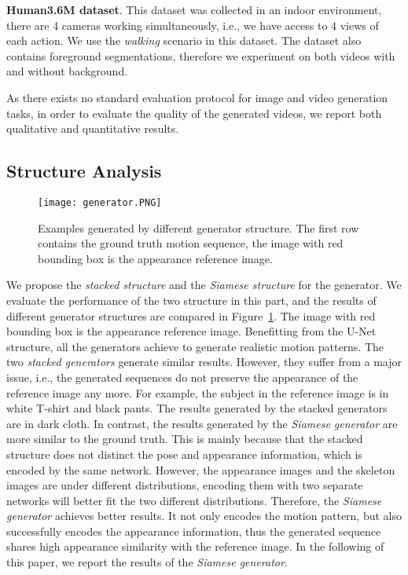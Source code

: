 \documentclass[journal]{IEEEtran}
\begin{document}
\textbf{Human3.6M dataset}. This dataset was collected in an indoor environment, there are 4 cameras working simultaneously, i.e., we have access to 4 views of each action. We use the \textit{walking} scenario in this dataset. The dataset also contains foreground segmentations, therefore we experiment on both videos with and without background.

As there exists no standard evaluation protocol for image and video generation tasks, in order to evaluate the quality of the generated videos, we report both qualitative and quantitative results.

\subsection{Structure Analysis}
\begin{figure}
\texttt{[image: generator.PNG]}
\caption{Examples generated by different generator structure. The first row contains the ground truth motion sequence, the image with red bounding box is the appearance reference image.}
\label{fig:generator}
\end{figure}
We propose the \textit{stacked structure} and the \textit{Siamese structure} for the generator. We evaluate the performance of the two structure in this part, and the results of different generator structures are compared in Figure~\ref{fig:generator}. The image with red bounding box is the appearance reference image. Benefitting from the U-Net structure, all the generators achieve to generate realistic motion patterns. The two \textit{stacked generators} generate similar results. However, they suffer from a major issue, i.e., the generated sequences do not preserve the appearance of the reference image any more. For example, the subject in the reference image is in white T-shirt and black pants. The results generated by the stacked generators are in dark cloth.
In contrast, the results generated by the \textit{Siamese generator} are more similar to the ground truth.
This is mainly because that the stacked structure does not distinct the pose and appearance information, which is encoded by the same network. However, the appearance images and the skeleton images are under different distributions, encoding them with two separate networks will better fit the two different distributions. Therefore, the \textit{Siamese generator} achieves better results. It not only encodes the motion pattern, but also successfully encodes the appearance information, thus the generated sequence shares high appearance similarity with the reference image.
In the following of this paper, we report the results of the \textit{Siamese generator}.
\end{document}
